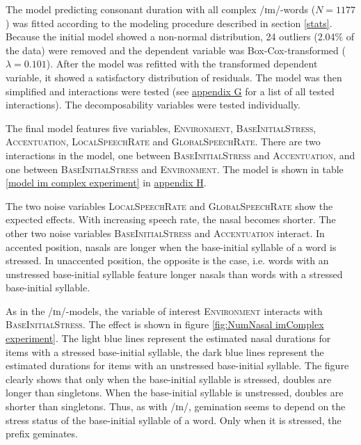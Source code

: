 The model predicting consonant duration with all complex /ɪm/-words ($N=1177$) was fitted according to the modeling procedure described in section \ref{stats}.
Because the initial model showed a non-normal distribution,  24 outliers (2.04\% of the data) were removed and the dependent variable was Box-Cox-transformed ($\lambda = 0.101$).  
After the model was refitted with the transformed dependent variable, it showed a satisfactory distribution of residuals. The model was then simplified and interactions were tested (see \hyperref[Appendix G Summaries of tested interactions in experimental study]{appendix G} for a list of all tested interactions). 
The decomposability variables were tested individually.



The final model features five variables, \textsc{Environment}, \textsc{BaseInitialStress}, \textsc{Accentuation}, \textsc{LocalSpeechRate} and \textsc{GlobalSpeechRate}. There are two interactions in the model, one between \textsc{BaseInitialStress} and \textsc{Accentuation}, and one between \textsc{BaseInitialStress} and \textsc{Environment}. The model is shown in table \ref{model im complex experiment} in \hyperref[Appendix H: Model Summaries Experiment]{appendix H}.

The two noise variables \textsc{LocalSpeechRate} and \textsc{GlobalSpeechRate} show the expected effects. With increasing speech rate, the nasal becomes shorter.
 The other two noise variables \textsc{BaseInitialStress} and \textsc{Accentuation} interact. In accented position, nasals are longer when the base-initial syllable of a word is stressed. In unaccented position, the opposite is the case, i.e. words with an unstressed base-initial syllable feature longer nasals than words with a stressed base-initial syllable. 
 


As in the /ɪn/-models, the variable of interest \textsc{Environment} interacts with \textsc{BaseInitialStress}. The effect is shown in figure \ref{fig:NumNasal imComplex experiment}. 
The light blue lines represent the estimated nasal durations for items with a stressed base-initial syllable, the dark blue lines represent  the estimated durations for items with an unstressed base-initial syllable.
The figure clearly shows that 
 only when the base-initial syllable is stressed, doubles are  longer than singletons. When the base-initial syllable is unstressed, doubles are shorter than singletons. 
Thus, as with /ɪn/, gemination seems to depend on the stress status of the base-initial syllable of a word. Only when it is stressed, the prefix  geminates.

